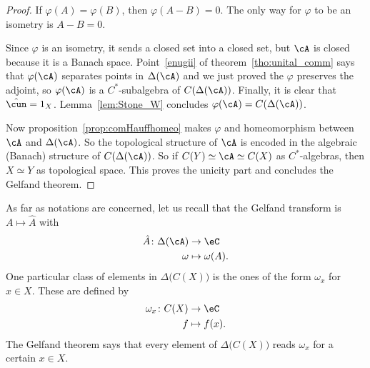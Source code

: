 \begin{proof}

	If $\varphi(A)=\varphi(B)$, then $\varphi(A-B)=0$. The only way for $\varphi$ to be an isometry is $A-B=0$.


	Since $\varphi$ is an isometry, it sends a closed set into a closed set, but $\cA$ is closed because it is a Banach space. Point~\ref{enugii} of theorem~\ref{tho:unital_comm} says that $\varphi(\cA)$ separates points in $\Delta(\cA)$ and we just proved the $\varphi$ preserves the adjoint, so $\varphi(\cA)$ is a $C^*$-subalgebra of $C(\Delta(\cA))$. Finally, it is clear that $\hat{\cun}=1_X$. Lemma~\ref{lem:Stone_W} concludes $\varphi(\cA)=C(\Delta(\cA))$.

	Now proposition~\ref{prop:comHauffhomeo} makes $\varphi$ and homeomorphism between $\cA$ and $\Delta(\cA)$. So the topological structure of $\cA$ is encoded in the algebraic (Banach) structure of $C(\Delta(\cA))$. So if $C(Y)\simeq\cA\simeq C(X)$ as $C^*$-algebras, then $X\simeq Y$ as topological space. This proves the unicity part and concludes the Gelfand theorem.

\end{proof}

As far as notations are concerned, let us recall that the Gelfand transform is $A\mapsto\hat A$ with
\begin{equation}
	\begin{aligned}
		\hat A\colon \Delta(\cA) & \to \eC            \\
		\omega                   & \mapsto \omega(A).
	\end{aligned}
\end{equation}
One particular class of elements in $\Delta\big( C(X) \big)$ is the ones of the form $\omega_x$ for $x\in X$. These are defined by
\begin{equation}
	\begin{aligned}
		\omega_x\colon C(X) & \to \eC       \\
		f                   & \mapsto f(x).
	\end{aligned}
\end{equation}
The Gelfand theorem says that every element of $\Delta \big(C(X))$ reads $\omega_x$ for a certain $x\in X$.

